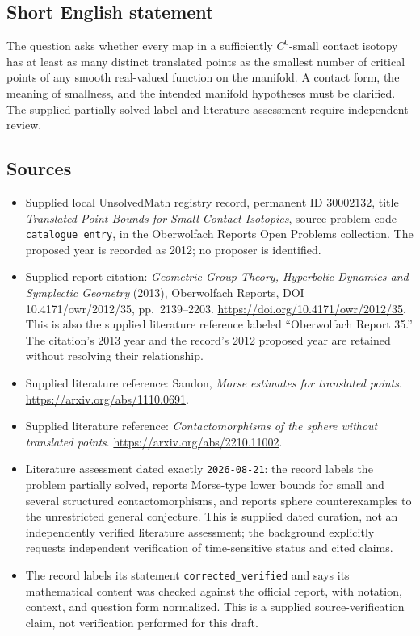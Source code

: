 \documentclass[11pt]{article}
\begin{document}
\subsection{Short English statement}
The question asks whether every map in a sufficiently \(C^0\)-small contact isotopy has at least as many distinct translated points as the smallest number of critical points of any smooth real-valued function on the manifold. A contact form, the meaning of smallness, and the intended manifold hypotheses must be clarified. The supplied partially solved label and literature assessment require independent review.
\subsection{Sources}
\begin{itemize}
\item Supplied local UnsolvedMath registry record, permanent ID \(30002132\), title \emph{Translated-Point Bounds for Small Contact Isotopies}, source problem code \texttt{catalogue entry}, in the Oberwolfach Reports Open Problems collection. The proposed year is recorded as 2012; no proposer is identified.
\item Supplied report citation: \emph{Geometric Group Theory, Hyperbolic Dynamics and Symplectic Geometry} (2013), Oberwolfach Reports, DOI 10.4171/owr/2012/35, pp.~2139--2203. \url{https://doi.org/10.4171/owr/2012/35}. This is also the supplied literature reference labeled ``Oberwolfach Report 35.'' The citation's 2013 year and the record's 2012 proposed year are retained without resolving their relationship.
\item Supplied literature reference: Sandon, \emph{Morse estimates for translated points}. \url{https://arxiv.org/abs/1110.0691}.
\item Supplied literature reference: \emph{Contactomorphisms of the sphere without translated points}. \url{https://arxiv.org/abs/2210.11002}.
\item Literature assessment dated exactly \texttt{2026-08-21}: the record labels the problem partially solved, reports Morse-type lower bounds for small and several structured contactomorphisms, and reports sphere counterexamples to the unrestricted general conjecture. This is supplied dated curation, not an independently verified literature assessment; the background explicitly requests independent verification of time-sensitive status and cited claims.
\item The record labels its statement \texttt{corrected\_verified} and says its mathematical content was checked against the official report, with notation, context, and question form normalized. This is a supplied source-verification claim, not verification performed for this draft.
\end{itemize}
\end{document}
